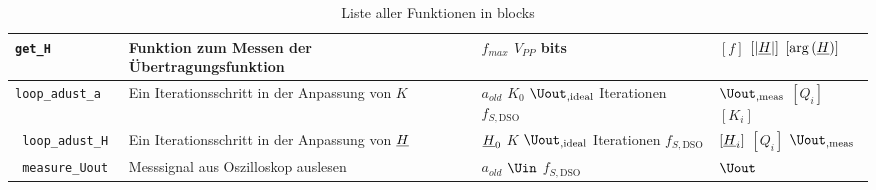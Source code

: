 \documentclass[../Report.tex]{subfiles}
\begin{document}
\begin{table}[H]
\begin{tabular}[t]{| >{\texttt\bgroup}m{3.5cm}<{\egroup}|m{8cm}|m{2cm}|m{2cm}|}
  \hline
  get\_H & Funktion zum Messen der Übertragungsfunktion & $f_{max}$ \newline $V_{PP}$ \newline bits & $[f]$ \newline $[|\underline{H}|]$ \newline $[\arg{(\underline{H})}]$\\
  \hline
  loop\_adust\_a & Ein Iterationsschritt in der Anpassung von $K$ & $a_{old}$ \newline $K_0$ \newline $\Uout_{,\textrm{ideal}}$ \newline Iterationen \newline $f_{S,\textrm{DSO}}$ & $\Uout_{,\textrm{meas}}$ \newline$[Q_i]$ \newline $[K_i]$\\
  \hline
  loop\_adust\_H & Ein Iterationsschritt in der Anpassung von $\underline{H}$ & $\underline{H}_0$ \newline $K$ \newline $\Uout_{,\textrm{ideal}}$ \newline Iterationen \newline $f_{S,\textrm{DSO}}$ & $[\underline{H}_i]$ \newline $[Q_i]$ \newline $\Uout_{,\textrm{meas}}$\\
  \hline
  measure\_Uout & Messsignal aus Oszilloskop auslesen & $a_{old}$ \newline $\Uin$ \newline $f_{S,\textrm{DSO}}$ & $\Uout$\\
  \hline
\end{tabular}
\caption{Liste aller Funktionen in blocks}
\label{tab:anhang.Funktionen.blocks}
\end{table}
\end{document}
